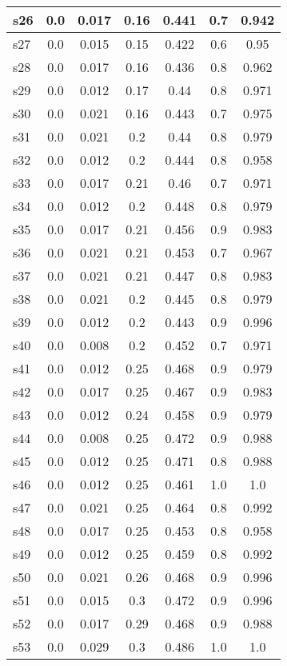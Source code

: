 \documentclass{article}
\begin{document}
\begin{tabular}{|l|c|c|c|c|c|c|}
s26 &0.0 & 0.017 & 0.16 & 0.441 & 0.7 & 0.942\\
\hline
s27 &0.0 & 0.015 & 0.15 & 0.422 & 0.6 & 0.95\\
\hline
s28 &0.0 & 0.017 & 0.16 & 0.436 & 0.8 & 0.962\\
\hline
s29 &0.0 & 0.012 & 0.17 & 0.44 & 0.8 & 0.971\\
\hline
s30 &0.0 & 0.021 & 0.16 & 0.443 & 0.7 & 0.975\\
\hline
s31 &0.0 & 0.021 & 0.2 & 0.44 & 0.8 & 0.979\\
\hline
s32 &0.0 & 0.012 & 0.2 & 0.444 & 0.8 & 0.958\\
\hline
s33 &0.0 & 0.017 & 0.21 & 0.46 & 0.7 & 0.971\\
\hline
s34 &0.0 & 0.012 & 0.2 & 0.448 & 0.8 & 0.979\\
\hline
s35 &0.0 & 0.017 & 0.21 & 0.456 & 0.9 & 0.983\\
\hline
s36 &0.0 & 0.021 & 0.21 & 0.453 & 0.7 & 0.967\\
\hline
s37 &0.0 & 0.021 & 0.21 & 0.447 & 0.8 & 0.983\\
\hline
s38 &0.0 & 0.021 & 0.2 & 0.445 & 0.8 & 0.979\\
\hline
s39 &0.0 & 0.012 & 0.2 & 0.443 & 0.9 & 0.996\\
\hline
s40 &0.0 & 0.008 & 0.2 & 0.452 & 0.7 & 0.971\\
\hline
s41 &0.0 & 0.012 & 0.25 & 0.468 & 0.9 & 0.979\\
\hline
s42 &0.0 & 0.017 & 0.25 & 0.467 & 0.9 & 0.983\\
\hline
s43 &0.0 & 0.012 & 0.24 & 0.458 & 0.9 & 0.979\\
\hline
s44 &0.0 & 0.008 & 0.25 & 0.472 & 0.9 & 0.988\\
\hline
s45 &0.0 & 0.012 & 0.25 & 0.471 & 0.8 & 0.988\\
\hline
s46 &0.0 & 0.012 & 0.25 & 0.461 & 1.0 & 1.0\\
\hline
s47 &0.0 & 0.021 & 0.25 & 0.464 & 0.8 & 0.992\\
\hline
s48 &0.0 & 0.017 & 0.25 & 0.453 & 0.8 & 0.958\\
\hline
s49 &0.0 & 0.012 & 0.25 & 0.459 & 0.8 & 0.992\\
\hline
s50 &0.0 & 0.021 & 0.26 & 0.468 & 0.9 & 0.996\\
\hline
s51 &0.0 & 0.015 & 0.3 & 0.472 & 0.9 & 0.996\\
\hline
s52 &0.0 & 0.017 & 0.29 & 0.468 & 0.9 & 0.988\\
\hline
s53 &0.0 & 0.029 & 0.3 & 0.486 & 1.0 & 1.0\\

\end{tabular}
\end{document}
